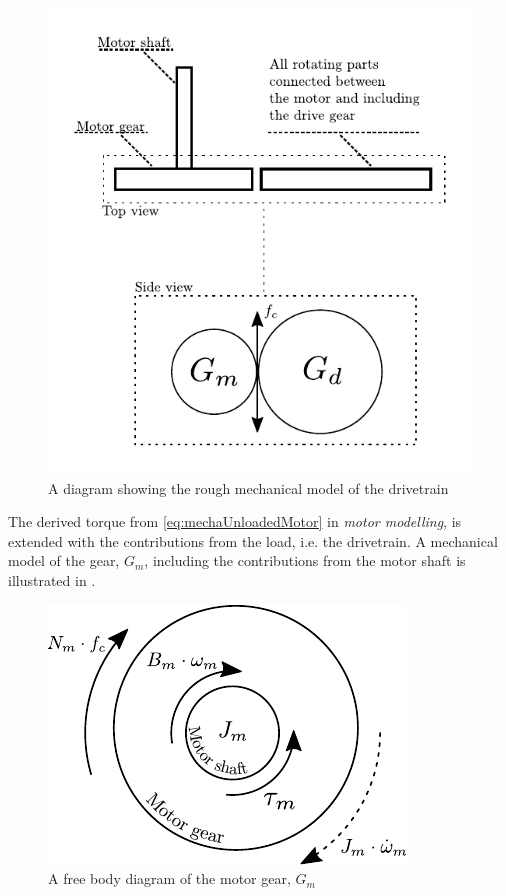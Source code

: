 \begin{figure}[H]
	\centering
	\includegraphics[scale=1]{figures/mechanicalDrawingSystem.pdf}
	\caption{A diagram showing the rough mechanical model of the drivetrain}
	\label{fig:DrivetrainMechanicalModel}
\end{figure}


The derived torque from \eqref{eq:mechaUnloadedMotor} in \textit{motor modelling}, is extended with the contributions from the load, i.e. the drivetrain. A mechanical model of the gear, $G_m$, including the contributions from the motor shaft is illustrated in .

\begin{figure}[H]
	\centering
	\includegraphics[scale=1.2]{figures/freeBodyMotorGear.pdf}
	\caption{A free body diagram of the motor gear, $G_m$}
	\label{fig:MotorGearFreeBodyDiagram}
\end{figure}

